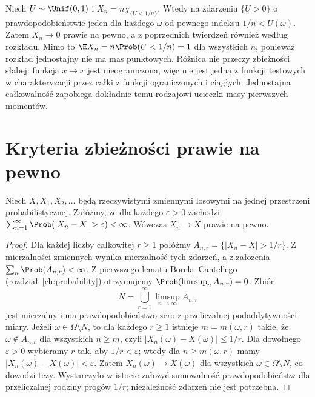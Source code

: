 
\begin{przyklad}
Niech $U\sim\Unif(0,1)$ i
$X_n=n\chi_{\{U<1/n\}}$. Wtedy na zdarzeniu
$\{U>0\}$ o prawdopodobieństwie jeden dla każdego
$\omega$ od pewnego indeksu $1/n<U(\omega)$.
Zatem $X_n\to0$ prawie na pewno, a z poprzednich
twierdzeń również według rozkładu.
Mimo to $\E X_n=n\Prob(U<1/n)=1$ dla wszystkich $n$,
ponieważ rozkład jednostajny nie ma mas punktowych.
Różnica nie przeczy zbieżności słabej: funkcja
$x\mapsto x$ jest nieograniczona, więc nie jest
jedną z funkcji testowych w charakteryzacji przez
całki z funkcji ograniczonych i ciągłych.
Jednostajna całkowalność zapobiega dokładnie temu
rodzajowi ucieczki masy pierwszych momentów.
\end{przyklad}

\section{Kryteria zbieżności prawie na pewno}

\begin{twierdzenie}
Niech $X,X_1,X_2,\ldots$ będą rzeczywistymi zmiennymi
losowymi na jednej przestrzeni probabilistycznej.
Załóżmy, że dla każdego
$\varepsilon>0$ zachodzi
$\sum_{n=1}^\infty\Prob(|X_n-X|>\varepsilon)<\infty$.
Wówczas $X_n\to X$ prawie na pewno.
\end{twierdzenie}
\begin{proof}
Dla każdej liczby całkowitej $r\geq1$ połóżmy
$A_{n,r}=\{|X_n-X|>1/r\}$. Z mierzalności zmiennych
wynika mierzalność tych zdarzeń, a z założenia
$\sum_n\Prob(A_{n,r})<\infty$.
Z pierwszego lematu Borela--Cantellego
(rozdział~\ref{ch:probability}) otrzymujemy
$\Prob(\limsup_n A_{n,r})=0$.
Zbiór
\[
N=\bigcup_{r=1}^\infty\limsup_{n\to\infty} A_{n,r}
\]
jest mierzalny i ma prawdopodobieństwo zero
z przeliczalnej podaddytywności miary.
Jeżeli $\omega\in\Omega\setminus N$, to dla każdego
$r\geq1$ istnieje $m=m(\omega,r)$ takie, że
$\omega\notin A_{n,r}$ dla wszystkich $n\geq m$,
czyli $|X_n(\omega)-X(\omega)|\leq1/r$.
Dla dowolnego $\varepsilon>0$ wybieramy $r$ tak,
aby $1/r<\varepsilon$; wtedy dla $n\geq m(\omega,r)$
mamy $|X_n(\omega)-X(\omega)|<\varepsilon$.
Zatem $X_n(\omega)\to X(\omega)$ dla wszystkich
$\omega\in\Omega\setminus N$, co dowodzi tezy.
Wystarczyło w istocie założyć sumowalność prawdopodobieństw
dla przeliczalnej rodziny progów $1/r$; niezależność
zdarzeń nie jest potrzebna.
\end{proof}

